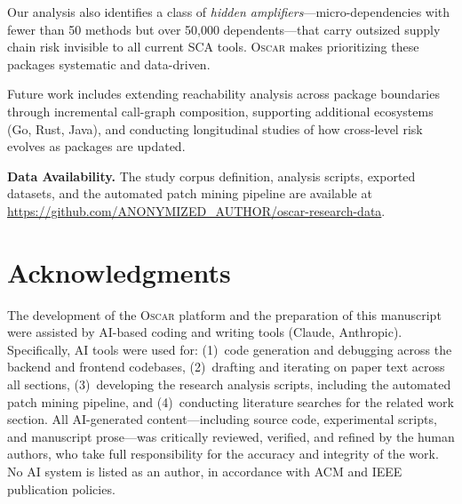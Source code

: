 \documentclass[conference]{IEEEtran}
\begin{document}
Our analysis also identifies a class of \emph{hidden amplifiers}---micro-dependencies with fewer than 50 methods but over 50,000 dependents---that carry outsized supply chain risk invisible to all current SCA tools. \textsc{Oscar} makes prioritizing these packages systematic and data-driven.

Future work includes extending reachability analysis across package boundaries through incremental call-graph composition, supporting additional ecosystems (Go, Rust, Java), and conducting longitudinal studies of how cross-level risk evolves as packages are updated.

\smallskip\noindent\textbf{Data Availability.} The study corpus definition, analysis scripts, exported datasets, and the automated patch mining pipeline are available at \url{https://github.com/ANONYMIZED_AUTHOR/oscar-research-data}.

\section*{Acknowledgments}

The development of the \textsc{Oscar} platform and the preparation of this manuscript were assisted by AI-based coding and writing tools (Claude, Anthropic). Specifically, AI tools were used for: (1)~code generation and debugging across the backend and frontend codebases, (2)~drafting and iterating on paper text across all sections, (3)~developing the research analysis scripts, including the automated patch mining pipeline, and (4)~conducting literature searches for the related work section. All AI-generated content---including source code, experimental scripts, and manuscript prose---was critically reviewed, verified, and refined by the human authors, who take full responsibility for the accuracy and integrity of the work. No AI system is listed as an author, in accordance with ACM and IEEE publication policies.

\balance


\end{document}
